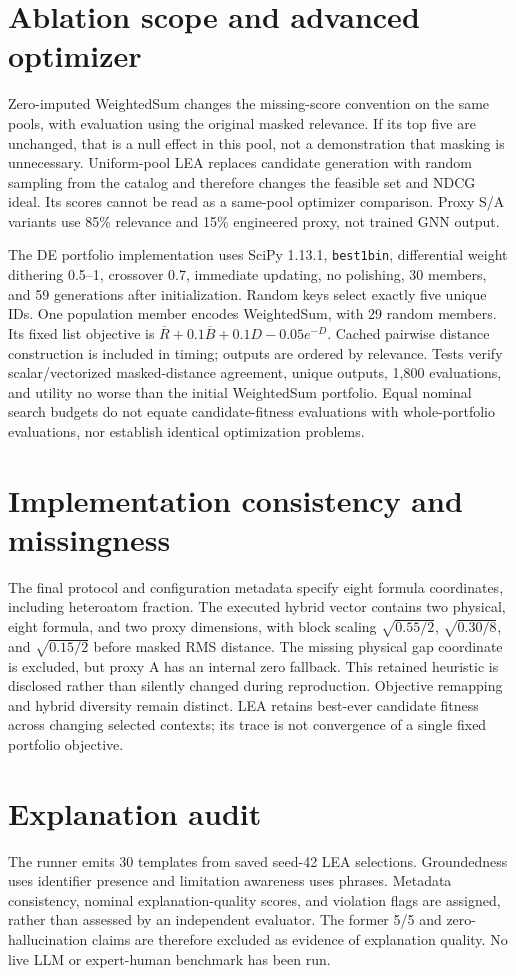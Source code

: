 \documentclass[11pt,a4paper]{article}
\begin{document}
\section*{Ablation scope and advanced optimizer}
Zero-imputed WeightedSum changes the missing-score convention on the same pools, with evaluation using the original masked relevance. If its top five are unchanged, that is a null effect in this pool, not a demonstration that masking is unnecessary. Uniform-pool LEA replaces candidate generation with random sampling from the catalog and therefore changes the feasible set and NDCG ideal. Its scores cannot be read as a same-pool optimizer comparison. Proxy S/A variants use 85\% relevance and 15\% engineered proxy, not trained GNN output.

The DE portfolio implementation uses SciPy 1.13.1, \texttt{best1bin}, differential weight dithering 0.5--1, crossover 0.7, immediate updating, no polishing, 30 members, and 59 generations after initialization. Random keys select exactly five unique IDs. One population member encodes WeightedSum, with 29 random members. Its fixed list objective is $\overline R+0.1\overline B+0.1D-0.05e^{-D}$. Cached pairwise distance construction is included in timing; outputs are ordered by relevance. Tests verify scalar/vectorized masked-distance agreement, unique outputs, 1,800 evaluations, and utility no worse than the initial WeightedSum portfolio. Equal nominal search budgets do not equate candidate-fitness evaluations with whole-portfolio evaluations, nor establish identical optimization problems.

\section*{Implementation consistency and missingness}
The final protocol and configuration metadata specify eight formula coordinates, including heteroatom fraction. The executed hybrid vector contains two physical, eight formula, and two proxy dimensions, with block scaling $\sqrt{0.55/2}$, $\sqrt{0.30/8}$, and $\sqrt{0.15/2}$ before masked RMS distance. The missing physical gap coordinate is excluded, but proxy A has an internal zero fallback. This retained heuristic is disclosed rather than silently changed during reproduction. Objective remapping and hybrid diversity remain distinct. LEA retains best-ever candidate fitness across changing selected contexts; its trace is not convergence of a single fixed portfolio objective.

\section*{Explanation audit}
The runner emits 30 templates from saved seed-42 LEA selections. Groundedness uses identifier presence and limitation awareness uses phrases. Metadata consistency, nominal explanation-quality scores, and violation flags are assigned, rather than assessed by an independent evaluator. The former 5/5 and zero-hallucination claims are therefore excluded as evidence of explanation quality. No live LLM or expert-human benchmark has been run.
\end{document}
